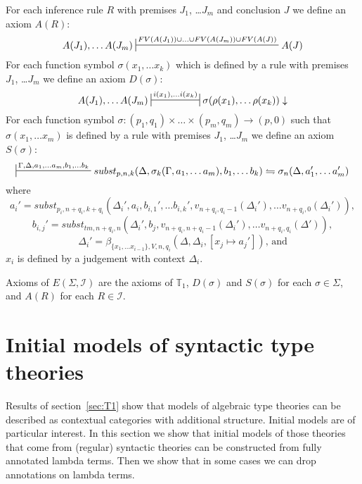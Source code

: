 \documentclass[reqno]{amsart}
\theoremstyle{definition}
\theoremstyle{remark}
\numberwithin{figure}{section}
\begin{document}
For each inference rule $R$ with premises $J_1$, \ldots $J_m$ and conclusion $J$ we define an axiom $A(R)$:
\[ A(J_1), \ldots A(J_m) \sststile{}{FV(A(J_1)) \cup \ldots \cup FV(A(J_m)) \cup FV(A(J))} A(J) \]
For each function symbol $\sigma(x_1, \ldots x_k)$ which is defined by a rule with premises $J_1$, \ldots $J_m$ we define an axiom $D(\sigma)$:
\[ A(J_1), \ldots A(J_m) \ssststile{}{i(x_1), \ldots i(x_k)} \sigma(\rho(x_1), \ldots \rho(x_k)) \downarrow \]
For each function symbol $\sigma : (p_1,q_1) \times \ldots \times (p_m,q_m) \to (p,0)$ such that $\sigma(x_1, \ldots x_m)$ is defined by a rule with premises $J_1$, \ldots $J_m$ we define an axiom $S(\sigma)$:
\[ \sststile{}{\Gamma, \Delta, a_1, \ldots a_m, b_1, \ldots b_k} subst_{p,n,k}(\Delta, \sigma_k(\Gamma, a_1, \ldots a_m), b_1, \ldots b_k) \leftrightharpoons \sigma_n(\Delta, a_1', \ldots a_m') \]
where
\[ a_i' = subst_{p_i,n+q_i,k+q_i}(\Delta_i', a_i, b_{i,1}', \ldots b_{i,k}', v_{n+q_i,q_i-1}(\Delta_i'), \ldots v_{n+q_i,0}(\Delta_i')), \]
\[ b_{i,j}' = subst_{tm,n+q_i,n}(\Delta_i', b_j, v_{n+q_i,n+q_i-1}(\Delta_i'), \ldots v_{n+q_i,q_i}(\Delta')), \]
\[ \Delta_i' = \beta_{\{ x_1, \ldots x_{i-1} \},V,n,q_i}(\Delta, \Delta_i, [x_j \mapsto a_j']) \text{, and} \]
$x_i$ is defined by a judgement with context $\Delta_i$.

Axioms of $E(\Sigma, \mathcal{I})$ are the axioms of $\mathbb{T}_1$, $D(\sigma)$ and $S(\sigma)$ for each $\sigma \in \Sigma$, and $A(R)$ for each $R \in \mathcal{I}$.

\section{Initial models of syntactic type theories}

Results of section~\ref{sec:T1} show that models of algebraic type theories can be described as contextual categories with additional structure.
Initial models are of particular interest.
In this section we show that initial models of those theories that come from (regular) syntactic theories can be constructed from fully annotated lambda terms.
Then we show that in some cases we can drop annotations on lambda terms.



\end{document}
